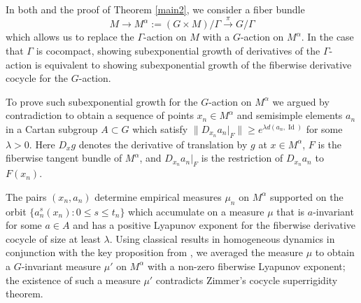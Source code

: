 \documentclass[10pt,reqno]{amsart}
\theoremstyle{Theorem}
\theoremstyle{definition}
\theoremstyle{remark}
\newcommand{\restrict}[2]{{#1}{|_{{ #2}}}}
\DeclareMathOperator{\Id}{Id}
\newcommand{\inv}{^{-1}}
\begin{document}
In both  \cite{BFH} and the proof of Theorem \ref{main2}, we consider a fiber bundle $$M \rightarrow M^{\alpha}:=(G \times M)/\Gamma \xrightarrow{\pi} G/\Gamma$$ which allows us to replace  the $\Gamma$-action on $M$ with a $G$-action on $M^\alpha$.  In the case that $\Gamma$ is cocompact,  showing subexponential growth of derivatives of the $\Gamma$-action is equivalent to showing subexponential growth of the fiberwise derivative cocycle for the $G$-action.



%

To prove such subexponential growth for the $G$-action on $M^{\alpha}$ we argued by contradiction to obtain a sequence of points $x_n \in M^{\alpha}$ and semisimple elements $a_n$ in a Cartan subgroup $A \subset G$  which satisfy $\|\restrict{D_{x_n}a_n}{F}\|  \geq e^{\lambda d(a_n, \Id)}$ for some $\lambda>0$. Here $D_{x} g$ denotes the derivative of translation by $g$ at $x\in M^\alpha$, $F$ is the fiberwise tangent bundle of $M^\alpha$, and $\restrict{D_{x_n}a_n}{F}$ is the restriction of $ D_{x_n}a_n $ to ${F(x_n)}$.


The pairs $(x_n, a_n)$ determine empirical measures $\mu_n$ on $M^{\alpha}$ supported on the orbit $\{a_n^s(x_n): 0\le s\le t_n\}$
which accumulate on a  %
measure $\mu$ that is $a$-invariant for some $a \in A$ and has a positive Lyapunov exponent for the fiberwise derivative cocycle of size at least  $\lambda$.
Using classical results in homogeneous dynamics in conjunction with the key proposition from \cite{AWBFRHZW-latticemeasure}, we averaged the measure $\mu$ to obtain a $G$-invariant measure $\mu'$ on $M^\alpha$ with a non-zero fiberwise Lyapunov exponent;  the existence of such a measure $\mu'$ contradicts Zimmer's cocycle superrigidity theorem.  %
\end{document}

